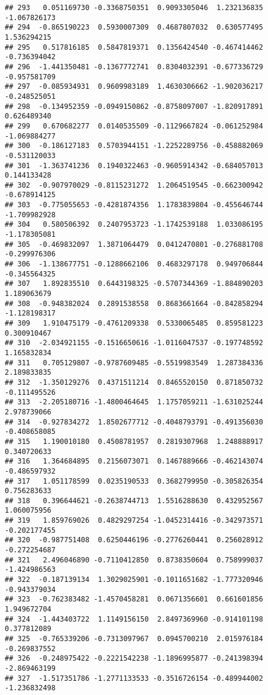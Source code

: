 \documentclass[
]{article}
\begin{document}
\begin{verbatim}
## 293   0.051169730 -0.3368750351  0.9093305046  1.232136835 -1.067826173
## 294  -0.865190223  0.5930007309  0.4687807032  0.630577495  1.536294215
## 295   0.517816185  0.5847819371  0.1356424540 -0.467414462 -0.736394042
## 296  -1.441350481 -0.1367772741  0.8304032391 -0.677336729 -0.957581709
## 297  -0.085934931  0.9609983189  1.4630306662 -1.902036217 -0.248525051
## 298  -0.134952359 -0.0949150862 -0.8758097007 -1.820917891  0.626489340
## 299   0.670682277  0.0140535509 -0.1129667824 -0.061252984 -1.069884277
## 300  -0.186127183  0.5703944151 -1.2252289756 -0.458882069 -0.531120033
## 301  -1.363741236  0.1940322463 -0.9605914342 -0.684057013  0.144133428
## 302  -0.907970029 -0.8115231272  1.2064519545 -0.662300942 -0.678914125
## 303  -0.775055653 -0.4281874356  1.1783839804 -0.455646744 -1.709982928
## 304   0.580506392  0.2407953723 -1.1742539188  1.033086195 -1.178305081
## 305  -0.469832097  1.3871064479  0.0412470801 -0.276881708 -0.299976306
## 306  -1.138677751 -0.1288662106  0.4683297178  0.949706844 -0.345564325
## 307   1.892835510  0.6443198325 -0.5707344369 -1.884890203  1.189063679
## 308  -0.948382024  0.2891538558  0.8683661664 -0.842858294 -1.128198317
## 309   1.910475179 -0.4761209338  0.5330065485  0.859581223  0.300910467
## 310  -2.034921155 -0.1516650616 -1.0116047537 -0.197748592  1.165832834
## 311   0.705129807 -0.9787609485 -0.5519983549  1.287384336  2.189833835
## 312  -1.350129276  0.4371511214  0.8465520150  0.871850732 -0.111495526
## 313  -2.205180716 -1.4800464645  1.1757059211 -1.631025244  2.978739066
## 314  -0.927834272  1.8502677712 -0.4048793791 -0.491356030 -0.408658085
## 315   1.190010180  0.4508781957  0.2819307968  1.248888917  0.340720633
## 316   1.364684895  0.2156073071  0.1467889666 -0.462143074 -0.486597932
## 317   1.051178599  0.0235190533  0.3682799950 -0.305826354  0.756283633
## 318   0.396644621 -0.2638744713  1.5516288630  0.432952567  1.060075956
## 319   1.859769026  0.4829297254 -1.0452314416 -0.342973571 -0.202177455
## 320  -0.987751408  0.6250446196 -0.2776260441  0.256028912 -0.272254687
## 321   2.496046890 -0.7110412850  0.8738350604  0.758999037 -1.424986563
## 322  -0.187139134  1.3029025901 -0.1011651682 -1.777320946 -0.943379034
## 323  -0.762383482 -1.4570458281  0.0671356601  0.661601856  1.949672704
## 324  -1.443403722  1.1149156150  2.8497369960 -0.914101198  0.377812089
## 325  -0.765339206 -0.7313097967  0.0945700210  2.015976184 -0.269837552
## 326  -0.248975422 -0.2221542238 -1.1896995877 -0.241398394 -2.869463199
## 327  -1.517351786 -1.2771133533 -0.3516726154 -0.489944002 -1.236832498

\end{verbatim}
\end{document}
